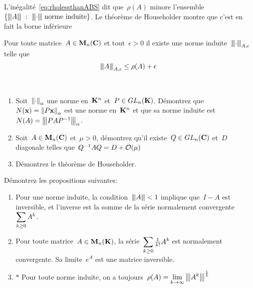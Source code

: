 
L'inégalité~\ref{eq:rholessthanABS} dit que~$\rho(A)$ minore
l'ensemble~$\left\{\ABS A\ :\ \ABS\cdot\ \textrm{norme induite}\right\}$.  Le
théorème de Householder montre que c'est en fait la borne inférieure

\begin{theorem}[Householder]
	Pour toute matrice~$A\in\mathbf{M}_n(\mathbf{C})$ et tout~$\epsilon>0$ il existe une norme
	induite~${\left\vert\kern-0.25ex\left\vert\kern-0.25ex\left\vert \cdot \right\vert\kern-0.25ex\right\vert\kern-0.25ex\right\vert}_{A,\epsilon}$ telle que
	\begin{equation}\label{eq:rholessthanABS}
		{\left\vert\kern-0.25ex\left\vert\kern-0.25ex\left\vert A \right\vert\kern-0.25ex\right\vert\kern-0.25ex\right\vert}_{A,\epsilon}\le\rho(A)+\epsilon
	\end{equation}
\end{theorem}

\begin{exercice}$ $
	\begin{enumerate}
		\item Soit~$\left\|\cdot\right\|_\alpha$ une norme en~$\mathbf{K}^n$ et~$P\in GL_n(\mathbf{K})$.
			Démontrez que~$N(\mathbf{x})=\left\|P\mathbf{x}\right\|_\alpha$ est une norme en~$\mathbf{K}^n$ et que
			sa norme induite est~$N(A)={\left\vert\kern-0.25ex\left\vert\kern-0.25ex\left\vert PAP^{-1} \right\vert\kern-0.25ex\right\vert\kern-0.25ex\right\vert}_\alpha$.
		\item Soit~$A\in\mathbf{M}_n(\mathbf{C})$ et~$\mu>0$, démontrez qu'il existe~$Q\in
			GL_n(\mathbf{C})$ et~$D$ diagonale telles que~$Q^{-1}AQ=D+\mathcal{O}(\mu)$
		\item Démontrez le théorème de Householder.
	\end{enumerate}
\end{exercice}



\begin{exercice}
	Démontrez les propositions suivantes:
	\begin{enumerate}
		\item Pour une norme induite, la condition~${\left\vert\kern-0.25ex\left\vert\kern-0.25ex\left\vert A \right\vert\kern-0.25ex\right\vert\kern-0.25ex\right\vert}<1$ implique que~$I-A$
			est inversible, et l'inverse est la somme de la série
			normalement convergente~$\displaystyle\sum_{k\ge0}A^k$.
		\item Pour toute matrice~$A\in\mathbf{M}_n(\mathbf{K})$, la
			série~$\displaystyle\sum_{k\ge0}\tfrac1{k!}A^k$ est normalement convergente.
			Sa limite~$e^A$ est une matrice inversible.
		\item $*$ Pour toute norme induite, on a
			toujours~$\displaystyle\rho(A)=\lim_{k\to\infty}{\left\vert\kern-0.25ex\left\vert\kern-0.25ex\left\vert A^k \right\vert\kern-0.25ex\right\vert\kern-0.25ex\right\vert}^{\frac1k}$
	\end{enumerate}
\end{exercice}


